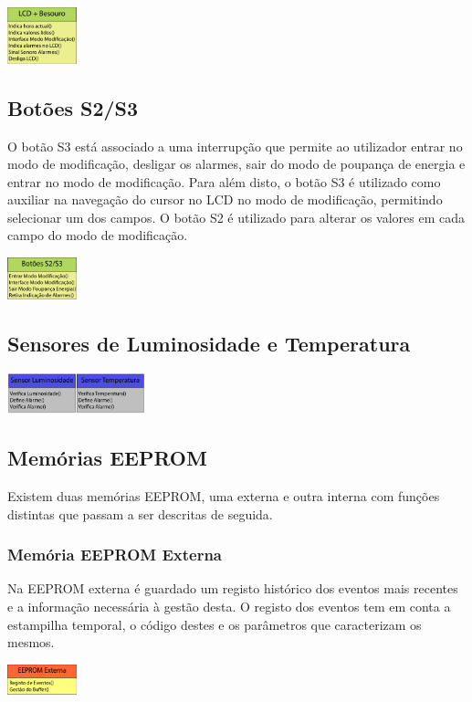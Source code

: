 \documentclass{article}
\begin{document}
	\begin{center}
		\includegraphics[width=0.15\textwidth]{scereport_05}
	\end{center}
	
	
	
	
	\subsection{Botões S2/S3}		
	

	O botão S3 está associado a uma interrupção que permite ao utilizador entrar no modo de modificação, desligar os alarmes, sair do modo de poupança de energia e entrar no modo de modificação. Para além disto, o botão S3 é utilizado como auxiliar na navegação do cursor no LCD no modo de modificação, permitindo selecionar um dos campos. O botão S2 é utilizado para alterar os valores em cada campo do modo de modificação.
		
		\begin{center}
			\includegraphics[width=0.15\textwidth]{scereport_06}
		\end{center}
		
	
		\subsection{Sensores de Luminosidade e Temperatura}		
		
		\begin{center}
			\includegraphics[width=0.3\textwidth]{scereport1_03}
		\end{center}
		
		\subsection{Memórias EEPROM}		
		Existem duas memórias EEPROM, uma externa e outra interna com funções distintas que passam a ser descritas de seguida.
		\subsubsection{Memória EEPROM Externa}
		Na EEPROM externa é guardado um registo histórico dos eventos mais recentes e a informação necessária à gestão desta. O registo dos eventos tem em conta a estampilha temporal, o código destes e os parâmetros que caracterizam os mesmos. 
		\begin{center}
			\includegraphics[width=0.15\textwidth]{scereport_03}
		\end{center}
\end{document}

